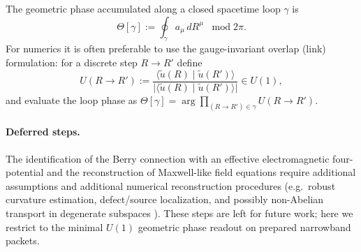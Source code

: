 The geometric phase accumulated along a closed spacetime loop $\gamma$ is
\begin{equation}
  \Theta[\gamma] := \oint_\gamma a_\mu\,dR^\mu \;\;\; \mathrm{mod}\;2\pi.
  \label{eq:berry-phase-loop}
\end{equation}
For numerics it is often preferable to use the gauge-invariant overlap (link) formulation:
for a discrete step $R\to R'$ define
\begin{equation}
  U(R\to R') :=
  \frac{\langle \tilde u(R)\mid \tilde u(R')\rangle}
       {\big|\langle \tilde u(R)\mid \tilde u(R')\rangle\big|}\in U(1),
  \label{eq:u1-link-variable}
\end{equation}
and evaluate the loop phase as $\Theta[\gamma]=\arg\prod_{(R\to R')\in\gamma} U(R\to R')$.

\paragraph{Deferred steps.}
The identification of the Berry connection with an effective electromagnetic four-potential and the
reconstruction of Maxwell-like field equations require additional assumptions and additional numerical reconstruction procedures
(e.g.\ robust curvature estimation, defect/source localization, and possibly non-Abelian transport in
degenerate subspaces \cite{WilczekZee1984}). These steps are left for future work; here we restrict to
the minimal $U(1)$ geometric phase readout on prepared narrowband packets.
